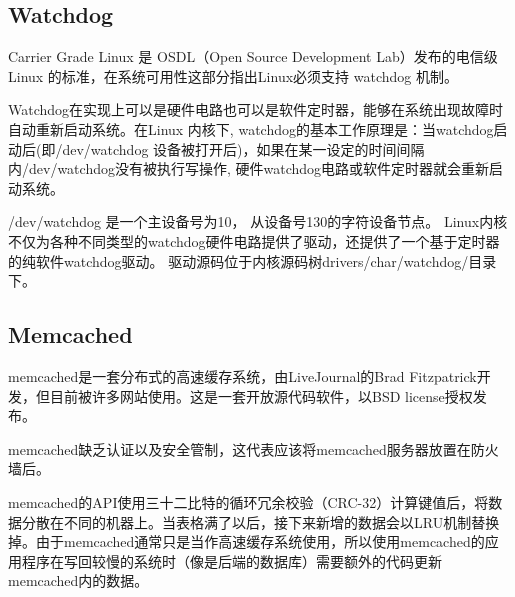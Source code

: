 \subsection{Watchdog}

Carrier Grade Linux 是 OSDL（Open Source Development Lab）发布的电信级 Linux 的标准，在系统可用性这部分指出Linux必须支持 watchdog 机制。

Watchdog在实现上可以是硬件电路也可以是软件定时器，能够在系统出现故障时自动重新启动系统。在Linux 内核下, watchdog的基本工作原理是：当watchdog启动后(即/dev/watchdog 设备被打开后)，如果在某一设定的时间间隔内/dev/watchdog没有被执行写操作, 硬件watchdog电路或软件定时器就会重新启动系统。

/dev/watchdog 是一个主设备号为10， 从设备号130的字符设备节点。 Linux内核不仅为各种不同类型的watchdog硬件电路提供了驱动，还提供了一个基于定时器的纯软件watchdog驱动。 驱动源码位于内核源码树drivers/char/watchdog/目录下。


\subsection{Memcached}

memcached是一套分布式的高速缓存系统，由LiveJournal的Brad Fitzpatrick开发，但目前被许多网站使用。这是一套开放源代码软件，以BSD license授权发布。

memcached缺乏认证以及安全管制，这代表应该将memcached服务器放置在防火墙后。

memcached的API使用三十二比特的循环冗余校验（CRC-32）计算键值后，将数据分散在不同的机器上。当表格满了以后，接下来新增的数据会以LRU机制替换掉。由于memcached通常只是当作高速缓存系统使用，所以使用memcached的应用程序在写回较慢的系统时（像是后端的数据库）需要额外的代码更新memcached内的数据。


\clearpage